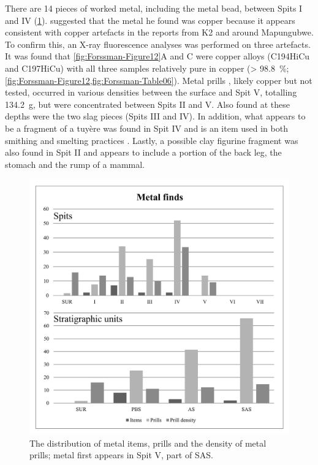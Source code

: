 There are 14 pieces  of worked metal, including the metal bead, between Spits I and IV (\cref{fig:Forssman-Figure11}). \textcite{Walker_1994} 
suggested that the metal he found was copper because it appears consistent with copper artefacts in the \textcites{Miller_2001}{Miller_2002} reports from K2 and around Mapungubwe. 
To confirm this, an X-ray fluorescence analyses was performed on three artefacts. 
It was found that \cref{fig:Forssman-Figure12}A and C were copper alloys (C194HiCu and C197HiCu) with all three samples relatively pure in copper (> \SI{98.8}{\percent}; \cref{fig:Forssman-Figure12,fig:Forssman-Table06}). 
Metal prills \parencite[see][]{Miller_2001}, 
likely copper but not tested, occurred in various densities between the surface and Spit V, totalling \SI{134.2}{\gram}, 
but were concentrated between Spits II and V. Also found at these depths were the two slag pieces (Spits III and IV). 
In addition, what appears to be a fragment of a tuyère was found in Spit IV and is an item used in both smithing and smelting practices \parencites{Miller_2001}{Miller_2002}. 
Lastly, a possible clay figurine fragment was also found in Spit II and appears to include a portion of the back leg, the stomach and the rump of a mammal.

	\begin{figure} %
		\includegraphics[width=\linewidth]{figures/Forssman-Figure11}
		\caption{The distribution of metal items, prills and the density of metal prills; metal first appears in Spit V, part of SAS.}
		\label{fig:Forssman-Figure11}
	\end{figure}

